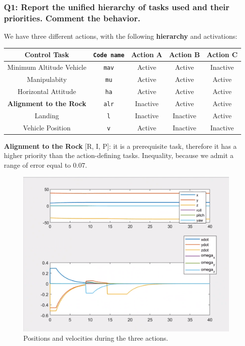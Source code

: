 \documentclass{article}
\newcommand{\ocio} {\marginpar{!}}
\begin{document}
\subsubsection{Q1: Report the unified hierarchy of tasks used and their priorities. Comment the behavior.}
We have three different actions, with the following \textbf{hierarchy} and activations:
\begin{center}
\begin{tabular}{ | c | c | c | c | c |}
\hline
 Control Task & \texttt{Code name} & Action A & Action B & Action C\\
 \hline
 Minimum Altitude Vehicle &  \texttt{mav} & Active & Active & Inactive\\  
 Manipulabity &  \texttt{mu} & Active & Active & Active\\
 Horizontal Attitude &  \texttt{ha} & Active & Active & Active\\
 \textbf{Alignment to the Rock}  & \texttt{alr} & Inactive & Active & Active \\
 Landing & \texttt{l} &Inactive & Inactive & Active \\
 Vehicle Position &  \texttt{v} &Active & Inactive & Inactive\\
 \hline
\end{tabular}
\end{center}
\vspace{5px}
\noindent

\begin{description}
\item \textbf{Alignment to the Rock} [R, I, P]: it is a prerequisite task, therefore it has a higher priority than the action-defining tasks. Inequality, because we admit a range of error equal to $0.07$.   \ocio 
\end{description}

\begin{figure}[h]
    \centering
    \includegraphics[scale=0.3]{311_ppdot.png}
    \caption{Positions and velocities during the three actions.}
    \label{graphes3}
\end{figure}
\end{document}
